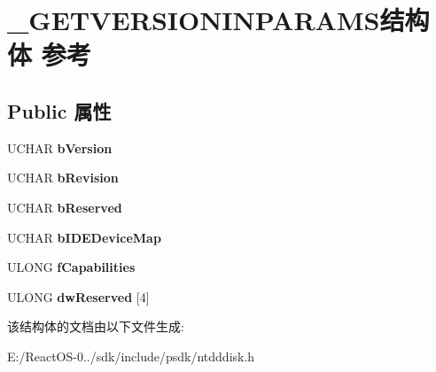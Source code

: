 \hypertarget{struct___g_e_t_v_e_r_s_i_o_n_i_n_p_a_r_a_m_s}{}\section{\+\_\+\+G\+E\+T\+V\+E\+R\+S\+I\+O\+N\+I\+N\+P\+A\+R\+A\+M\+S结构体 参考}
\label{struct___g_e_t_v_e_r_s_i_o_n_i_n_p_a_r_a_m_s}
\subsection*{Public 属性}
\begin{DoxyCompactItemize}
\item 
\mbox{\label{struct___g_e_t_v_e_r_s_i_o_n_i_n_p_a_r_a_m_s_a754b6ce6c4be0b01c446851adcbac761}} 
U\+C\+H\+AR {\bfseries b\+Version}
\item 
\mbox{\label{struct___g_e_t_v_e_r_s_i_o_n_i_n_p_a_r_a_m_s_ae63e74c934a199c587c1aadb5df859bb}} 
U\+C\+H\+AR {\bfseries b\+Revision}
\item 
\mbox{\label{struct___g_e_t_v_e_r_s_i_o_n_i_n_p_a_r_a_m_s_a5be58eef299feca7ac4eae153582cb36}} 
U\+C\+H\+AR {\bfseries b\+Reserved}
\item 
\mbox{\label{struct___g_e_t_v_e_r_s_i_o_n_i_n_p_a_r_a_m_s_a0ea0635b88fcf382ac0646b097c9b331}} 
U\+C\+H\+AR {\bfseries b\+I\+D\+E\+Device\+Map}
\item 
\mbox{\label{struct___g_e_t_v_e_r_s_i_o_n_i_n_p_a_r_a_m_s_aff0d0b8e3fd971daca275ad7cfa5f1f7}} 
U\+L\+O\+NG {\bfseries f\+Capabilities}
\item 
\mbox{\label{struct___g_e_t_v_e_r_s_i_o_n_i_n_p_a_r_a_m_s_a0cdfe2fd493591888ac41a678a0020a2}} 
U\+L\+O\+NG {\bfseries dw\+Reserved} \mbox{[}4\mbox{]}
\end{DoxyCompactItemize}


该结构体的文档由以下文件生成\+:\begin{DoxyCompactItemize}
\item 
E\+:/\+React\+O\+S-\/0../sdk/include/psdk/ntdddisk.\+h\end{DoxyCompactItemize}

